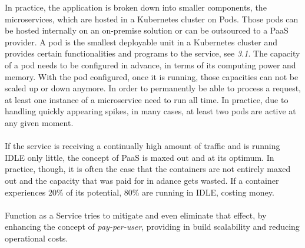 \documentclass[a4paper,11pt, pagesize]{scrartcl}
\begin{document}
\begin{spacing}{1.2}
In practice, the application is broken down into smaller components, the microservices, which are hosted in a Kubernetes cluster on Pods. Those pods can be hosted internally on an on-premise solution or can be outsourced to a PaaS provider. A pod is the smallest deployable unit in a Kubernetes cluster and provides certain functionalities and programs to the service, see \textit{3.1}. The capacity of a pod needs to be configured in advance, in terms of its computing power and memory. With the pod configured, once it is running, those capacities can not be scaled up or down anymore. In order to permanently be able to process a request, at least one instance of a microservice need to run all time. In practice, due to handling quickly appearing spikes, in many cases, at least two pods are active at any given moment. \\\\
If the service is receiving a continually high amount of traffic and is running IDLE only little, the concept of PaaS is maxed out and at its optimum. In practice, though, it is often the case that the containers are not entirely maxed out and the capacity that was paid for in adance gets wasted. If a container experiences 20\% of its potential, 80\% are running in IDLE, costing money. \\\\ Function as a Service tries to mitigate and even eliminate that effect, by enhancing the concept of \textit{pay-per-user}, providing in build scalability and reducing operational costs. 

\end{spacing}
\end{document}
